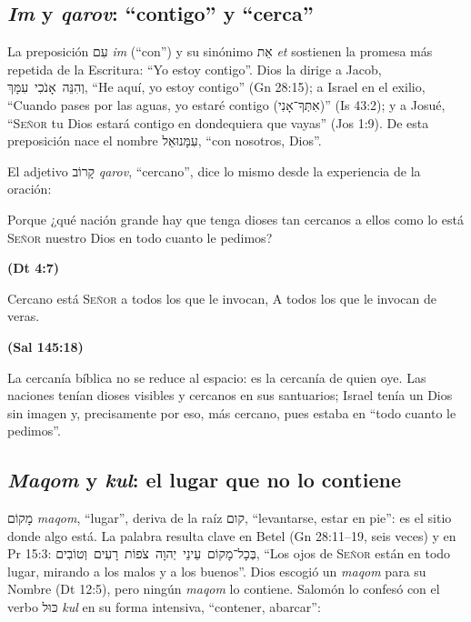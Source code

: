 \documentclass[11pt,letterpaper]{article}
\newcommand{\heb}[1]{\mbox{\foreignlanguage{hebrew}{#1}}}
\newcommand{\SENOR}{\textsc{Señor}}
\newcommand{\fuente}[1]{\par\hfill{\upshape\bfseries\small\textcolor{azul}{#1}}}
\begin{document}
\subsection{\emph{Im} y \emph{qarov}: ``contigo'' y ``cerca''}

La preposición \heb{עִם} \emph{im} (``con'') y su sinónimo \heb{אֵת} \emph{et} sostienen la promesa más repetida de la Escritura: ``Yo estoy contigo''. Dios la dirige a Jacob, \heb{וְהִנֵּה אָנֹכִי עִמָּךְ}, ``He aquí, yo estoy contigo'' (Gn 28:15); a Israel en el exilio, ``Cuando pases por las aguas, yo estaré contigo (\heb{אִתְּךָ־אָנִי})'' (Is 43:2); y a Josué, ``\SENOR{} tu Dios estará contigo en dondequiera que vayas'' (Jos 1:9). De esta preposición nace el nombre \heb{עִמָּנוּאֵל}, ``con nosotros, Dios''.

El adjetivo \heb{קָרוֹב} \emph{qarov}, ``cercano'', dice lo mismo desde la experiencia de la oración:

\begin{cita}Porque ¿qué nación grande hay que tenga dioses tan cercanos a ellos como lo está \SENOR{} nuestro Dios en todo cuanto le pedimos?\fuente{(Dt 4:7)}\end{cita}
\begin{cita}Cercano está \SENOR{} a todos los que le invocan, A todos los que le invocan de veras.\fuente{(Sal 145:18)}\end{cita}

La cercanía bíblica no se reduce al espacio: es la cercanía de quien oye. Las naciones tenían dioses visibles y cercanos en sus santuarios; Israel tenía un Dios sin imagen y, precisamente por eso, más cercano, pues estaba en ``todo cuanto le pedimos''.

\subsection{\emph{Maqom} y \emph{kul}: el lugar que no lo contiene}

\heb{מָקוֹם} \emph{maqom}, ``lugar'', deriva de la raíz \heb{קום}, ``levantarse, estar en pie'': es el sitio donde algo está. La palabra resulta clave en Betel (Gn 28:11--19, seis veces) y en Pr 15:3: \heb{בְּכָל־מָקוֹם עֵינֵי יְהוָה צֹפוֹת רָעִים וְטוֹבִים}, ``Los ojos de \SENOR{} están en todo lugar, mirando a los malos y a los buenos''. Dios escogió un \emph{maqom} para su Nombre (Dt 12:5), pero ningún \emph{maqom} lo contiene. Salomón lo confesó con el verbo \heb{כּוּל} \emph{kul} en su forma intensiva, ``contener, abarcar'':
\end{document}
